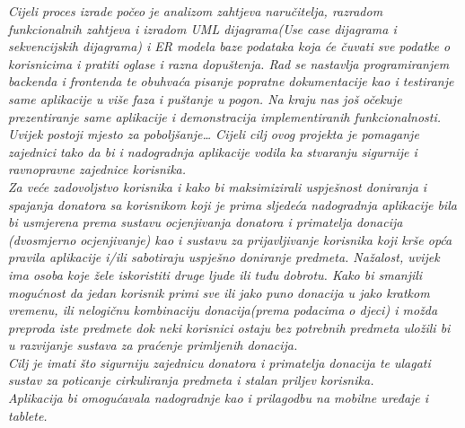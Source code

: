 		\textit{Cijeli proces izrade počeo je analizom zahtjeva naručitelja, razradom funkcionalnih zahtjeva i izradom UML dijagrama(Use case dijagrama i sekvencijskih dijagrama) i ER modela baze podataka koja će čuvati sve podatke o korisnicima i pratiti oglase i razna dopuštenja. Rad se nastavlja programiranjem backenda i frontenda te obuhvaća pisanje popratne dokumentacije kao i testiranje same aplikacije u više faza i puštanje u pogon. Na kraju nas još očekuje prezentiranje same aplikacije i demonstracija implementiranih funkcionalnosti.}\\
		\newline
		\textit{Uvijek postoji mjesto za poboljšanje… Cijeli cilj ovog projekta je pomaganje zajednici tako da bi i nadogradnja aplikacije vodila ka stvaranju sigurnije i ravnopravne zajednice korisnika. }\\
		\newline
		\textit{Za veće zadovoljstvo korisnika i kako bi maksimizirali uspješnost doniranja i spajanja donatora sa korisnikom koji je prima sljedeća nadogradnja aplikacije bila bi usmjerena prema sustavu ocjenjivanja donatora i primatelja donacija (dvosmjerno ocjenjivanje) kao i sustavu za prijavljivanje korisnika koji krše opća pravila aplikacije i/ili sabotiraju uspješno doniranje predmeta. Nažalost, uvijek ima osoba koje žele iskoristiti druge ljude ili tuđu dobrotu. Kako bi smanjili mogućnost da jedan korisnik primi sve ili jako puno donacija u jako kratkom vremenu, ili nelogičnu kombinaciju donacija(prema podacima o djeci) i možda preproda iste predmete dok neki korisnici ostaju bez potrebnih predmeta uložili bi u razvijanje sustava za praćenje primljenih donacija.}\\
		\newline
		\textit{Cilj je imati što sigurniju zajednicu donatora i primatelja donacija te ulagati sustav za poticanje cirkuliranja predmeta i stalan priljev korisnika. }\\
		\newline
		\textit{Aplikacija bi omogućavala nadogradnje kao i prilagodbu na mobilne uređaje i tablete.}
		\eject
		